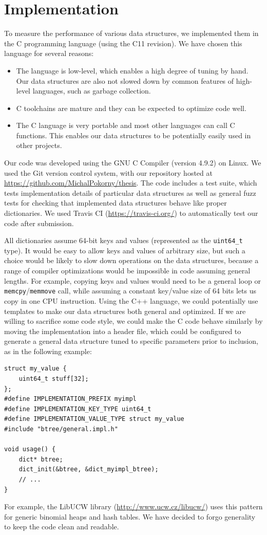 \chapter{Implementation}
\label{chapter:implementation}
To measure the performance of various data structures, we implemented them
in the C programming language (using the C11 revision).
We have chosen this language for several reasons:
\begin{itemize}
\item The language is low-level, which enables a high degree of tuning by hand.
	Our data structures are also not slowed down by common features of
	high-level languages, such as garbage collection.
\item C toolchains are mature and they can be expected to optimize code well.
\item The C language is very portable and most other languages can
	call C functions. This enables our data structures to be potentially
	easily used in other projects.
\end{itemize}

Our code was developed using the GNU C Compiler (version 4.9.2) on Linux.
We used the Git version control system, with our repository hosted at
\url{https://github.com/MichalPokorny/thesis}. The code includes a test suite,
which tests implementation details of particular data structures as well
as general fuzz tests for checking that implemented data structures behave
like proper dictionaries. We used Travis CI (\url{https://travis-ci.org/})
to automatically test our code after submission.

All dictionaries assume 64-bit keys and values (represented as the
\texttt{uint64\_t} type). It would be easy to allow keys and values of arbitrary
size, but such a choice would be likely to slow down operations on
the data structures, because a range of compiler optimizations would
be impossible in code assuming general lengths. For example, copying
keys and values would need to be a general loop or
\texttt{memcpy}/\texttt{memmove} call, while assuming a constant key/value
size of 64 bits lets us copy in one CPU instruction. Using the C++ language,
we could potentially use templates to make our data structures both general
and optimized. If we are willing to sacrifice some code style, we could
make the C code behave similarly by moving the implementation into a header
file, which could be configured to generate a general data structure
tuned to specific parameters prior to inclusion, as in the following example:
\begin{lstlisting}
struct my_value {
	uint64_t stuff[32];
};
#define IMPLEMENTATION_PREFIX myimpl
#define IMPLEMENTATION_KEY_TYPE uint64_t
#define IMPLEMENTATION_VALUE_TYPE struct my_value
#include "btree/general.impl.h"

void usage() {
	dict* btree;
	dict_init(&btree, &dict_myimpl_btree);
	// ...
}
\end{lstlisting}
For example, the LibUCW library (\url{http://www.ucw.cz/libucw/})
uses this pattern for generic binomial heaps and hash tables.
We have decided to forgo generality to keep the code clean and readable.

